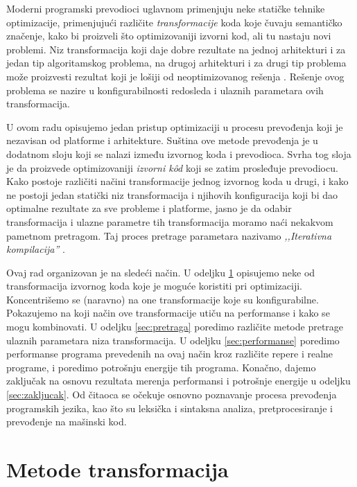 \documentclass[a4paper]{article}
\begin{document}
\par 
Moderni programski prevodioci uglavnom primenjuju neke statičke tehnike optimizacije, primenjujući različite 
\emph{transformacije} koda koje čuvaju semantičko značenje, kako bi proizveli što optimizovaniji izvorni kod, ali tu nastaju novi problemi. 
Niz transformacija koji daje dobre rezultate na jednoj arhitekturi i za jedan tip algoritamskog problema, 
na drugoj arhitekturi i za drugi tip problema može proizvesti rezultat koji je lošiji od neoptimizovanog rešenja \cite{gheorghita2005iterative}.
Rešenje ovog problema se nazire u konfigurabilnosti redosleda i ulaznih parametara ovih transformacija.
\par
U ovom radu opisujemo jedan pristup optimizaciji u procesu prevođenja koji je nezavisan od platforme i arhitekture. 
Suština ove metode prevođenja je u dodatnom sloju koji se nalazi između izvornog koda i prevodioca. 
Svrha tog sloja je da proizvede optimizovaniji \emph{izvorni k\^{o}d} koji se zatim prosleđuje 
prevodiocu. Kako postoje različiti načini transformacije jednog izvornog koda u drugi, i kako ne postoji jedan statički niz transformacija i njihovih konfiguracija koji bi dao optimalne rezultate za sve probleme i platforme, 
jasno je da odabir transformacija i ulazne parametre tih transformacija moramo naći nekakvom pametnom pretragom. 
Taj proces pretrage parametara nazivamo \emph {,,Iterativna kompilacija''} \cite{kisuki2000iterative}.
\par
Ovaj rad organizovan je na sledeći način. 
U odeljku \ref{sec:transformacije} opisujemo neke od transformacija izvornog koda koje je moguće koristiti pri optimizaciji. 
Koncentrišemo se (naravno) na one transformacije koje su konfigurabilne. Pokazujemo na koji način ove transformacije utiču na performanse i kako se mogu kombinovati. 
U odeljku \ref{sec:pretraga} poredimo različite metode pretrage ulaznih parametara niza transformacija.
U odeljku \ref{sec:performanse} poredimo performanse programa prevedenih na ovaj način kroz različite repere i realne programe, i poredimo potrošnju energije tih programa.
Konačno, dajemo zaključak na osnovu rezultata merenja performansi i potrošnje energije u odeljku \ref{sec:zakljucak}.
Od čitaoca se očekuje osnovno poznavanje procesa prevođenja programskih jezika, kao što su leksička i sintaksna analiza, pretprocesiranje i prevođenje na mašinski kod.

\section{Metode transformacija}
\label{sec:transformacije}
\end{document}
